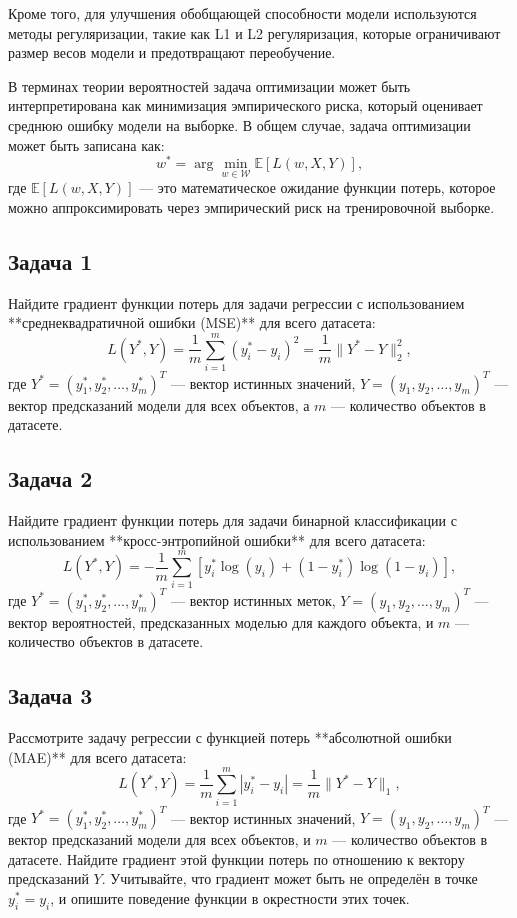 Кроме того, для улучшения обобщающей способности модели используются методы регуляризации, такие как L1 и L2 регуляризация, которые ограничивают размер весов модели и предотвращают переобучение.

В терминах теории вероятностей задача оптимизации может быть интерпретирована как минимизация эмпирического риска, который оценивает среднюю ошибку модели на выборке. В общем случае, задача оптимизации может быть записана как:
\[
    w^* = \arg\min_{w \in \mathcal{W}} \mathbb{E}[L(w, X, Y)],
\]
где \( \mathbb{E}[L(w, X, Y)] \) — это математическое ожидание функции потерь, которое можно аппроксимировать через эмпирический риск на тренировочной выборке.

\subsection*{Задача 1}

    Найдите градиент функции потерь для задачи регрессии с использованием **среднеквадратичной ошибки (MSE)** для всего датасета:
    \[
    L(Y^*, Y) = \frac{1}{m} \sum_{i=1}^m (y_i^* - y_i)^2 = \frac{1}{m} \|Y^* - Y\|_2^2,
    \]
    где \( Y^* = (y_1^*, y_2^*, \dots, y_m^*)^T \) — вектор истинных значений, \( Y = (y_1, y_2, \dots, y_m)^T \) — вектор предсказаний модели для всех объектов, а \( m \) — количество объектов в датасете. 

\subsection*{Задача 2}

    Найдите градиент функции потерь для задачи бинарной классификации с использованием **кросс-энтропийной ошибки** для всего датасета:
    \[
    L(Y^*, Y) = - \frac{1}{m} \sum_{i=1}^m \left[ y_i^* \log(y_i) + (1 - y_i^*) \log(1 - y_i) \right],
    \]
    где \( Y^* = (y_1^*, y_2^*, \dots, y_m^*)^T \) — вектор истинных меток, \( Y = (y_1, y_2, \dots, y_m)^T \) — вектор вероятностей, предсказанных моделью для каждого объекта, и \( m \) — количество объектов в датасете.

\subsection*{Задача 3}

    Рассмотрите задачу регрессии с функцией потерь **абсолютной ошибки (MAE)** для всего датасета:
    \[
    L(Y^*, Y) = \frac{1}{m} \sum_{i=1}^m |y_i^* - y_i| = \frac{1}{m} \|Y^* - Y\|_1,
    \]
    где \( Y^* = (y_1^*, y_2^*, \dots, y_m^*)^T \) — вектор истинных значений, \( Y = (y_1, y_2, \dots, y_m)^T \) — вектор предсказаний модели для всех объектов, и \( m \) — количество объектов в датасете. Найдите градиент этой функции потерь по отношению к вектору предсказаний \( Y \). Учитывайте, что градиент может быть не определён в точке \( y_i^* = y_i \), и опишите поведение функции в окрестности этих точек.




